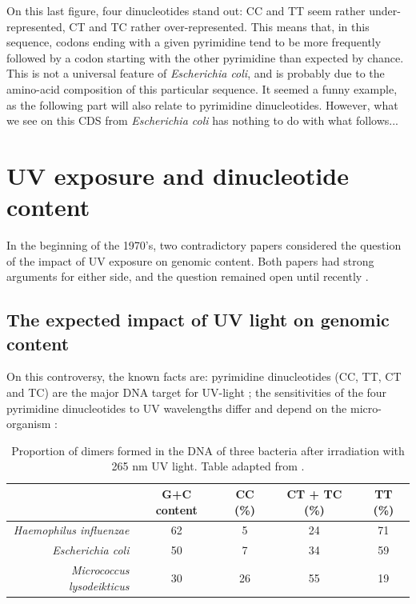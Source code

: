 \documentclass{article}
\begin{document}
On this last figure, four dinucleotides stand out: CC and TT seem
rather under-represented, CT and TC rather over-represented. This
means that, in this sequence, codons ending with a given pyrimidine
tend to be more frequently followed by a codon starting with the other
pyrimidine than expected by chance. This is not a universal feature of
\textit{Escherichia coli}, and is probably due to the amino-acid
composition of this particular sequence. It seemed a funny example, as
the following part will also relate to pyrimidine dinucleotides.
However, what we see on this CDS from \textit{Escherichia coli} has
nothing to do with what follows...

\section{UV exposure and dinucleotide content}

In the beginning of the 1970's, two contradictory papers considered
the question of the impact of UV exposure on genomic content. Both
papers had strong arguments for either side, and the question remained
open until recently \cite{UV}.

\subsection{The expected impact of UV light on genomic content}

On this controversy, the known facts are: pyrimidine dinucleotides
(CC, TT, CT and TC) are the major DNA target for UV-light
\cite{Setlow}; the sensitivities of the four pyrimidine dinucleotides
to UV wavelengths differ and depend on the micro-organism
\cite{Setlow}:

\begin{table}[H]
\begin{center}
\begin{tabular}{rcccc}
  \hline
  & G+C content & CC (\%) & CT + TC (\%) & TT (\%)\\
  \hline
  \textit{Haemophilus influenzae} & 62 & 5 & 24 & 71 \\
  \hline
  \textit{Escherichia coli} & 50 & 7 & 34 & 59 \\
  \hline
  \textit{Micrococcus lysodeikticus} & 30 & 26 & 55 & 19 \\
  \hline
\end{tabular}
\caption{Proportion of dimers formed in the DNA of three bacteria
  after irradiation with 265 nm UV light. Table adapted from
  \cite{Setlow}.}
\label{sensitivity}
\end{center}
\end{table}
\end{document}
